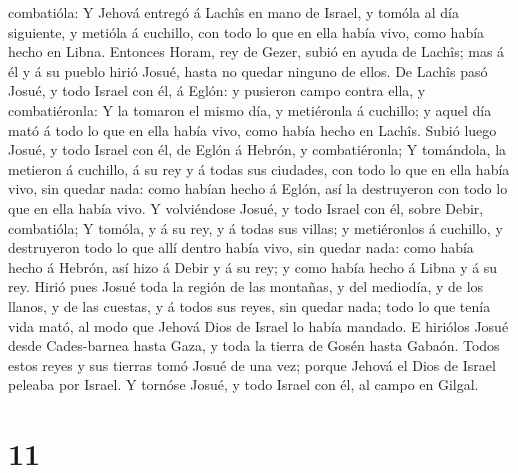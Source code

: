 combatióla:  Y Jehová entregó á Lachîs en mano de Israel,
y tomóla al día siguiente, y metióla á cuchillo, con todo lo que en ella
había vivo, como había hecho en Libna.  Entonces Horam,
rey de Gezer, subió en ayuda de Lachîs; mas á él y á su pueblo hirió
Josué, hasta no quedar ninguno de ellos.  De Lachîs pasó
Josué, y todo Israel con él, á Eglón: y pusieron campo contra ella, y
combatiéronla:  Y la tomaron el mismo día, y metiéronla á
cuchillo; y aquel día mató á todo lo que en ella había vivo, como había
hecho en Lachîs.  Subió luego Josué, y todo Israel con
él, de Eglón á Hebrón, y combatiéronla;  Y tomándola, la
metieron á cuchillo, á su rey y á todas sus ciudades, con todo lo que en
ella había vivo, sin quedar nada: como habían hecho á Eglón, así la
destruyeron con todo lo que en ella había vivo.  Y
volviéndose Josué, y todo Israel con él, sobre Debir, combatióla;
 Y tomóla, y á su rey, y á todas sus villas; y
metiéronlos á cuchillo, y destruyeron todo lo que allí dentro había
vivo, sin quedar nada: como había hecho á Hebrón, así hizo á Debir y á
su rey; y como había hecho á Libna y á su rey.  Hirió
pues Josué toda la región de las montañas, y del mediodía, y de los
llanos, y de las cuestas, y á todos sus reyes, sin quedar nada; todo lo
que tenía vida mató, al modo que Jehová Dios de Israel lo había mandado.
 E hiriólos Josué desde Cades-barnea hasta Gaza, y toda
la tierra de Gosén hasta Gabaón.  Todos estos reyes y sus
tierras tomó Josué de una vez; porque Jehová el Dios de Israel peleaba
por Israel.  Y tornóse Josué, y todo Israel con él, al
campo en Gilgal.

\hypertarget{section-10}{%
\section{11}\label{section-10}}

